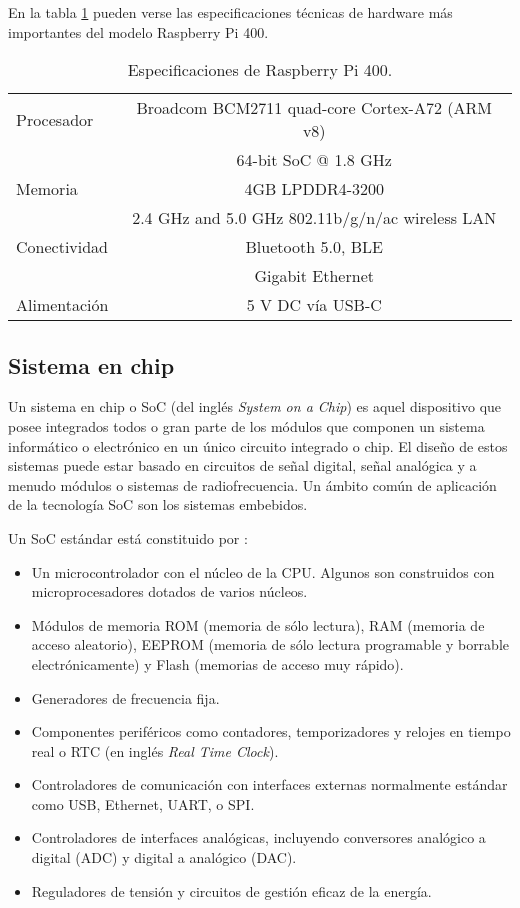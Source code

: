 En la tabla \ref{tab:Especificaciones Raspberry Pi 400} pueden verse las especificaciones técnicas de hardware más importantes del modelo Raspberry Pi 400.

\begin{table}[h]
\centering
\caption[Especificaciones de Raspberry Pi 400]{Especificaciones de Raspberry Pi 400.}
\begin{tabular}{l c}
\toprule
Procesador		&	Broadcom BCM2711 quad-core Cortex-A72 (ARM v8) \\
				&	64-bit SoC @ 1.8 GHz \\
\midrule
Memoria			&	4GB LPDDR4-3200 \\
\midrule
				&	2.4 GHz and 5.0 GHz 802.11b/g/n/ac wireless LAN \\
Conectividad		&	Bluetooth 5.0, BLE\\
				&   Gigabit Ethernet \\
\midrule
Alimentación		&	5 V DC vía USB-C\\
\bottomrule
\hline
\end{tabular}
\label{tab:Especificaciones Raspberry Pi 400}
\end{table}

\subsection{Sistema en chip}
\label{subsection:SistemaEnChip}

Un sistema en chip o SoC (del inglés \textit{System on a Chip}) es aquel dispositivo que posee integrados todos o gran parte de los módulos que componen un sistema informático o electrónico en un único circuito integrado o chip. El diseño de estos sistemas puede estar basado en circuitos de señal digital, señal analógica y a menudo módulos o sistemas de radiofrecuencia. Un ámbito común de aplicación de la tecnología SoC son los sistemas embebidos.

Un SoC estándar está constituido por \citep{12}:

\begin{itemize}
	\item Un microcontrolador con el núcleo de la CPU. Algunos son construidos con microprocesadores dotados de varios núcleos.
	\item Módulos de memoria ROM (memoria de sólo lectura), RAM (memoria de acceso aleatorio), EEPROM (memoria de sólo lectura programable y borrable electrónicamente) y Flash (memorias de acceso muy rápido).
	\item Generadores de frecuencia fija.
	\item Componentes periféricos como contadores, temporizadores y relojes en tiempo real o RTC (en inglés \textit{Real Time Clock}).
	\item Controladores de comunicación con interfaces externas normalmente estándar como USB, Ethernet, UART, o SPI.
	\item Controladores de interfaces analógicas, incluyendo conversores analógico a digital (ADC) y digital a analógico (DAC).
	\item Reguladores de tensión y circuitos de gestión eficaz de la energía.
\end{itemize}

